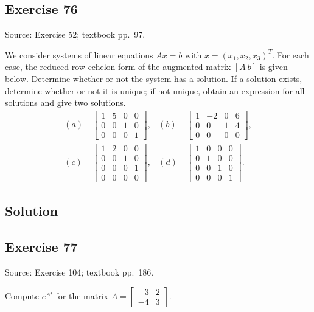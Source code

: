 \documentclass[12pt,a4paper]{article}
\newlength{\questionroom}
\newenvironment{questionprompt}{%
  \begin{lrbox}{\questionbox}\begin{minipage}{\linewidth}%
}{%
  \end{minipage}\end{lrbox}%
  \setlength{\questionroom}{\dimexpr\ht\questionbox+\dp\questionbox+5.2cm\relax}%
  \ifdim\questionroom>\textheight\setlength{\questionroom}{\textheight}\fi
  \Needspace{\questionroom}%
  \noindent\usebox{\questionbox}\par
}
\begin{document}
\begin{questionprompt}
\section*{Exercise 76}
\label{practice:76}
{\small Source: Exercise 52; textbook pp.~97.}\par
We consider systems of linear equations $Ax=b$ with $x=(x_1,x_2,x_3)^T$.
For each case, the reduced row echelon form of the augmented matrix $[A\ b]$ is given below. Determine whether or not the system has a solution. If a solution exists, determine whether or not it is unique; if not unique, obtain an expression for all solutions and give two solutions.
\begin{align*}
(a)&\ \begin{bmatrix}1&5&0&0\\0&0&1&0\\0&0&0&1\end{bmatrix},&
(b)&\ \begin{bmatrix}1&-2&0&6\\0&0&1&4\\0&0&0&0\end{bmatrix},\\
(c)&\ \begin{bmatrix}1&2&0&0\\0&0&1&0\\0&0&0&1\\0&0&0&0\end{bmatrix},&
(d)&\ \begin{bmatrix}1&0&0&0\\0&1&0&0\\0&0&1&0\\0&0&0&1\end{bmatrix}.
\end{align*}
\end{questionprompt}
\subsection*{Solution}
\vspace{3.5cm}


\begin{questionprompt}
\section*{Exercise 77}
\label{practice:77}
{\small Source: Exercise 104; textbook pp.~186.}\par
Compute $e^{At}$ for the matrix $A=\begin{bmatrix}-3&2\\-4&3\end{bmatrix}$.
\end{questionprompt}
\end{document}

